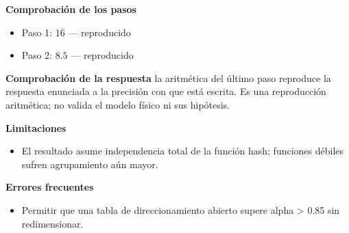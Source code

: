 \documentclass{book}
\begin{document}
\begin{tcolorbox}[title={Problema resuelto}, studiumworked, breakable]
\noindent\textbf{Comprobación de los pasos}
\begin{itemize}
\item Paso 1: $16$ — reproducido
\item Paso 2: $8.5$ — reproducido
\end{itemize}

\noindent\textbf{Comprobación de la respuesta} la aritmética del último paso reproduce la respuesta enunciada a la precisión con que está escrita. Es una reproducción aritmética; no valida el modelo físico ni sus hipótesis.

\noindent\textbf{Limitaciones}
\begin{itemize}
\item El resultado asume independencia total de la función hash; funciones débiles sufren agrupamiento aún mayor.
\end{itemize}

\noindent\textbf{Errores frecuentes}
\begin{itemize}
\item Permitir que una tabla de direccionamiento abierto supere alpha > 0.85 sin redimensionar.
\end{itemize}
\end{tcolorbox}
\end{document}
